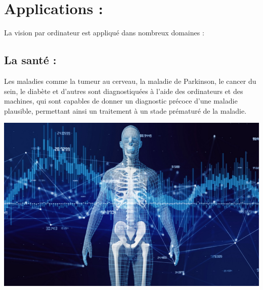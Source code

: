 
\section{Applications :}
La vision par ordinateur est appliqué dans nombreux domaines :
\subsection{La santé :}
Les maladies comme la tumeur au cerveau, la maladie de Parkinson, le cancer du sein, le diabète et d’autres sont diagnostiquées à l’aide des ordinateurs et des machines, qui  sont capables de donner un diagnostic précoce d’une maladie plausible, permettant ainsi un traitement à un stade prématuré de la maladie.\\

\begin{center}
    \includegraphics[scale=0.25]{img3.png}
        \label{fig1}
\end{center} 

